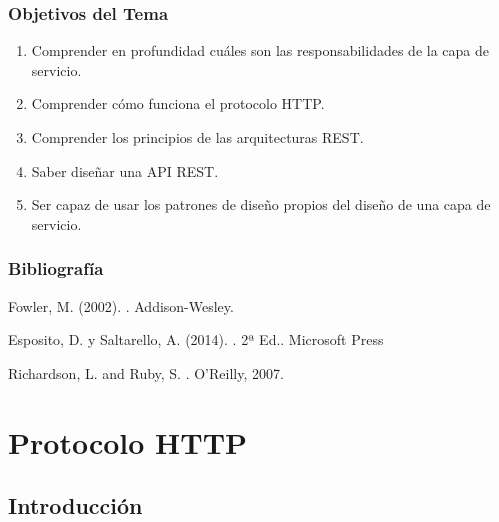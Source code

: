 \documentclass[a4paper,slidestop,xcolor=pst,blue]{beamer}
\begin{document}
\begin{frame}[c]
    \frametitle{Objetivos del Tema}
    \begin{enumerate}[<+->]
         \item Comprender en profundidad cuáles son las responsabilidades de la capa de servicio.
         \item Comprender cómo funciona el protocolo HTTP.
         \item Comprender los principios de las arquitecturas REST.
         \item Saber diseñar una API REST.
         \item Ser capaz de usar los patrones de diseño propios del diseño de una capa de servicio.
    \end{enumerate}
\end{frame}

\begin{frame}[c]
    \frametitle{Bibliografía}
    \begin{thebibliography}{1}

        Fowler, M. (2002).
        .
        \newblock Addison-Wesley.

        Esposito, D. y Saltarello, A. (2014).
        . 2ª Ed..
        \newblock Microsoft Press

        Richardson, L. and Ruby, S.
        .
        \newblock  O'Reilly, 2007.

    \end{thebibliography}
\end{frame}

\section{Protocolo HTTP}

\subsection{Introducción}
\end{document}
